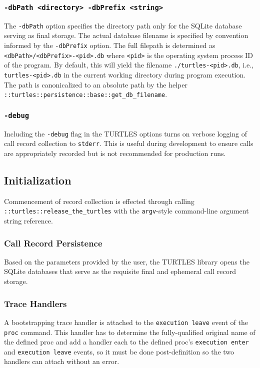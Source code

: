 \documentclass{article}[letter,10pt]
\begin{document}
{{    \subsubsection{\texttt{-dbPath <directory> -dbPrefix <string>}}{
      The \texttt{-dbPath} option specifies the directory path only for the SQLite database serving
      as final storage. The actual database filename is specified by convention
      informed by the \texttt{-dbPrefix} option. The full filepath is
      determined as \texttt{<dbPath>/<dbPrefix>-<pid>.db} where \texttt{<pid>}
      is the operating system process ID of the program. By default, this will
      yield the filename \texttt{./turtles-<pid>.db}, i.e., \texttt{turtles-<pid>.db}
      in the current working directory during program execution. The path is canonicalized
      to an absolute path by the helper \texttt{::turtles::persistence::base::get\_db\_filename}.
    }
    \subsubsection{\texttt{-debug}}{
      Including the \texttt{-debug} flag in the TURTLES options turns on verbose logging
      of call record collection to \texttt{stderr}. This is useful during development to
      ensure calls are appropriately recorded but is not recommended for production runs.
    }
  }

  \subsection{Initialization}{
    Commencement of record collection is effected through calling \texttt{::turtles::release\_the\_turtles}
    with the \texttt{argv}-style command-line argument string reference.

    \subsubsection{Call Record Persistence}{
      Based on the parameters provided by the user, the TURTLES library opens the SQLite databases that
      serve as the requisite final and ephemeral call record storage.
    }
    \subsubsection{Trace Handlers}{
      A bootstrapping trace handler is attached to the \texttt{execution leave} event of the \texttt{proc} command.
      This handler has to determine the fully-qualified original name of the defined proc and
      add a handler each to the defined proc's \texttt{execution enter} and \texttt{execution leave} events,
      so it must be done post-definition so the two handlers can attach without an error.

}}}
\end{document}
